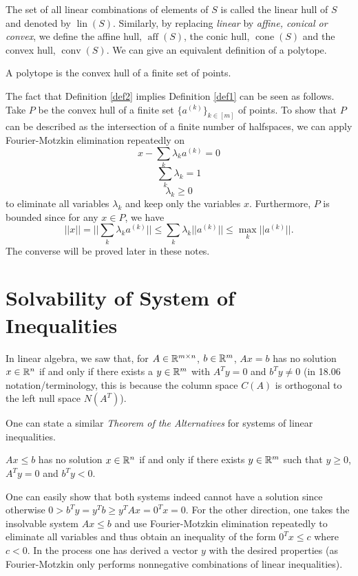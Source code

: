 \documentclass[12pt]{article}
\newcommand{\aff}{\operatorname{aff}}
\newcommand{\lin}{\operatorname{lin}}
\newcommand{\cone}{\operatorname{cone}}
\newcommand{\conv}{\operatorname{conv}}
\begin{document}
The set of all linear combinations of elements of $S$ is called the
linear hull of $S$ and denoted by $\lin(S)$. Similarly, by replacing
{\it linear} by {\it affine, conical or convex},  we define the
affine hull, $\aff(S)$, the conic hull, $\cone(S)$ and the convex hull,
$\conv(S)$.  We can give an equivalent definition of a polytope.

\begin{definition} \label{def2}
A polytope is the convex hull of a finite set of points.
\end{definition}

The fact that Definition \ref{def2} implies Definition \ref{def1} can be seen as follows. Take $P$ be the convex hull of a finite set $\{a^{(k)}\}_{k\in[m]}$ of points. To show that $P$ can be described as the intersection of a finite number of halfspaces, we can apply 
Fourier-Motzkin elimination repeatedly on
$$x-\sum_k \lambda_k a^{(k)} = 0$$
$$  \sum_k \lambda_k=1$$
$$\lambda_k\geq 0$$
to eliminate all variables $\lambda_k$ and keep only the variables
$x$. Furthermore, $P$ is bounded since for any $x\in P$, we have 
$$||x||=||\sum_k \lambda_k a^{(k)}|| \leq \sum_k \lambda_k ||a^{(k)}|| \leq \max_k ||a^{(k)}||.$$ The converse  will be proved later in these notes.

\section{Solvability of
  System of Inequalities}

In linear algebra, we saw that, for $A\in {\mathbb R}^{m\times n}$, $b\in {\mathbb R}^m$,
$Ax=b$ has no solution $x\in {\mathbb R}^n$ if and only if
there exists a $y\in {\mathbb R}^m$ with $A^Ty=0$ and $b^Ty\neq 0$ (in 18.06
notation/terminology, this is because the column
space $C(A)$ is orthogonal to the left null space $N(A^T)$).

One can state a similar {\it Theorem of the Alternatives} for systems
of linear inequalities. 

\begin{theorem}
$Ax \leq b$ has no solution $x\in {\mathbb R}^n$ if and only if there exists
  $y\in {\mathbb R}^m$ such that $y\geq 0$, $A^Ty=0$ and $b^Ty<0$.
\end{theorem}

One can easily show that both systems indeed cannot have a solution
since otherwise $0>b^Ty=y^Tb \geq y^TAx =0^Tx=0$. For the other
direction, one takes the insolvable system $Ax\leq b$ and use 
Fourier-Motzkin elimination repeatedly to eliminate all variables and
thus obtain an inequality of the form $0^Tx\leq c$ where $c<0$. In the
process one has derived a vector $y$ with the desired properties (as
Fourier-Motzkin only performs nonnegative combinations of linear
inequalities). 
\end{document}
